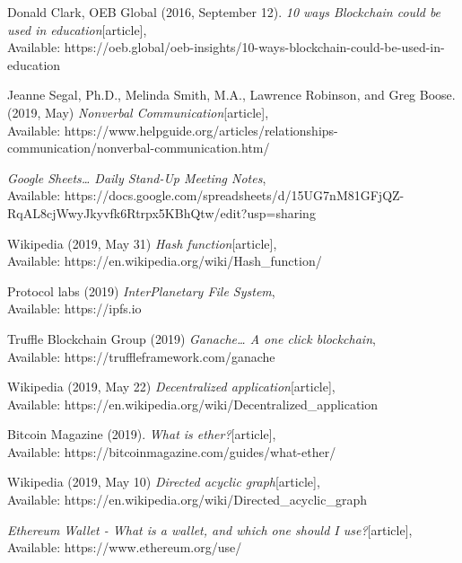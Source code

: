 \begin{thebibliography}{20}
Donald Clark, OEB Global (2016, September 12).
\emph{10 ways Blockchain could be used in education}[article],\\
Available: {https://oeb.global/oeb-insights/10-ways-blockchain-could-be-used-in-education}

  Jeanne Segal, Ph.D., Melinda Smith, M.A., Lawrence Robinson, and Greg Boose. (2019, May)
\emph{Nonverbal Communication}[article],\\
Available: {https://www.helpguide.org/articles/relationships-communication/nonverbal-communication.htm/}

\emph{Google Sheets… Daily Stand-Up Meeting Notes},\\
Available: {https://docs.google.com/spreadsheets/d/15UG7nM81GFjQZ-RqAL8cjWwyJkyvfk6Rtrpx5KBhQtw/edit?usp=sharing}

 Wikipedia (2019, May 31)
\emph{Hash function}[article],\\
Available: {https://en.wikipedia.org/wiki/Hash\_function/}

Protocol labs (2019)
\emph{InterPlanetary File System},\\
Available: {https://ipfs.io}

 Truffle Blockchain Group (2019)
\emph{Ganache… A one click blockchain},\\
Available: {https://truffleframework.com/ganache}

 Wikipedia (2019, May 22)
\emph{Decentralized application}[article],\\
Available: {https://en.wikipedia.org/wiki/Decentralized\_application}

 Bitcoin Magazine (2019).
\emph{What is ether?}[article],\\
Available: {https://bitcoinmagazine.com/guides/what-ether/}

Wikipedia (2019, May 10)
\emph{Directed acyclic graph}[article],\\
Available: {https://en.wikipedia.org/wiki/Directed\_acyclic\_graph}

\emph{Ethereum Wallet - What is a wallet, and which one should I use?}[article],\\
Available: {https://www.ethereum.org/use/}


\end{thebibliography}

